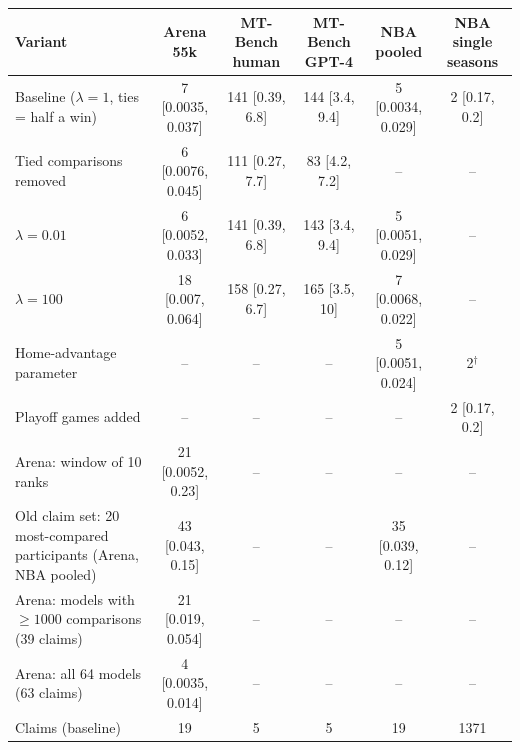 \begin{tabular}{lccccc}
\toprule
Variant & Arena 55k & MT-Bench human & MT-Bench GPT-4 & NBA pooled & NBA single seasons \\
\midrule
Baseline ($\lambda=1$, ties = half a win) & 7 [0.0035, 0.037] & 141 [0.39, 6.8] & 144 [3.4, 9.4] & 5 [0.0034, 0.029] & 2 [0.17, 0.2] \\
Tied comparisons removed & 6 [0.0076, 0.045] & 111 [0.27, 7.7] & 83 [4.2, 7.2] & -- & -- \\
$\lambda=0.01$ & 6 [0.0052, 0.033] & 141 [0.39, 6.8] & 143 [3.4, 9.4] & 5 [0.0051, 0.029] & -- \\
$\lambda=100$ & 18 [0.007, 0.064] & 158 [0.27, 6.7] & 165 [3.5, 10] & 7 [0.0068, 0.022] & -- \\
Home-advantage parameter & -- & -- & -- & 5 [0.0051, 0.024] & 2$^\dagger$ \\
Playoff games added & -- & -- & -- & -- & 2 [0.17, 0.2] \\
Arena: window of 10 ranks & 21 [0.0052, 0.23] & -- & -- & -- & -- \\
Old claim set: 20 most-compared participants (Arena, NBA pooled) & 43 [0.043, 0.15] & -- & -- & 35 [0.039, 0.12] & -- \\
Arena: models with $\ge 1000$ comparisons (39 claims) & 21 [0.019, 0.054] & -- & -- & -- & -- \\
Arena: all 64 models (63 claims) & 4 [0.0035, 0.014] & -- & -- & -- & -- \\
\midrule
Claims (baseline) & 19 & 5 & 5 & 19 & 1371 \\
\bottomrule
\end{tabular}
